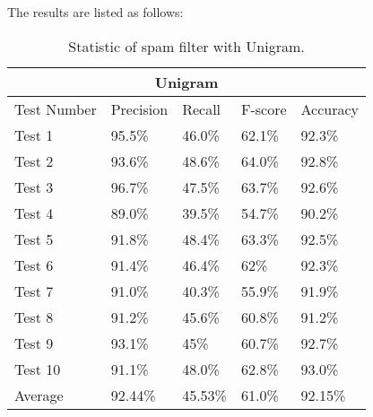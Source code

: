 \documentclass{article}
\begin{document}
                                 
                                 
                                 
The results are listed as follows:


\begin{table}[h!]
\centering
\begin{tabular}{ |p{2cm}|p{1.1cm}|p{1cm}| p{1.5cm}|p{1.2cm}| }
\hline
\multicolumn{5}{|c|}{Unigram} \\
\hline
Test Number& Precision &Recall &F-score &Accuracy\\
\hline
Test 1 & 95.5\% &46.0\%&62.1\% &  92.3\%\\
Test 2 & 93.6\%   & 48.6\% &64.0\% &92.8\%\\
Test 3 &96.7\% & 47.5\%&63.7\% &92.6\% \\
Test 4 &89.0\% & 39.5\%&54.7\% &90.2\% \\
Test 5 & 91.8\% & 48.4\% &63.3\% &92.5\%\\
Test 6 & 91.4\% & 46.4\% &62\% & 92.3\% \\
Test 7 & 91.0\% & 40.3\% &55.9\% &91.9\%\\
Test 8 & 91.2\% & 45.6\% &60.8\% &91.2\%\\
Test 9 & 93.1\% & 45\% &60.7\% &92.7\%\\
Test 10 & 91.1\% & 48.0\% &62.8\% &93.0\%\\
\hline
Average & 92.44\% & 45.53\% &61.0\% &92.15\%\\
\hline
\end{tabular}
\caption{Statistic of spam filter with Unigram.}
\end{table}
\end{document}
